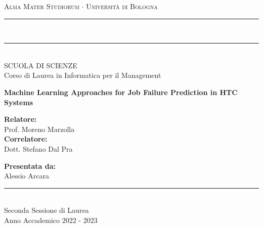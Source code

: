 \begin{titlepage}
  \centering
  {\Large \textsc{Alma Mater Studiorum $\cdot$ Università di Bologna}} \\
  \vspace{1mm}
  \rule[0.1cm]{15.8cm}{0.1mm} \\
  \rule[0.5cm]{15.8cm}{0.6mm} \\
  {\small SCUOLA DI SCIENZE \\
  Corso di Laurea in Informatica per il Management} \\
  
  \vspace{40mm}
  
  {\LARGE \textbf{Machine Learning Approaches for Job Failure Prediction in HTC Systems}} \\
  
  \vspace{40mm}
  
  \begin{minipage}[t]{0.47\textwidth}
    \raggedright
    \large \textbf{Relatore:} \\
    Prof. Moreno Marzolla \\
    \vspace{5mm}
    \textbf{Correlatore:} \\ 
    Dott. Stefano Dal Pra \\
  \end{minipage}
  \hfill
  \begin{minipage}[t]{0.47\textwidth}
    \raggedleft
    \large \textbf{Presentata da:} \\
    Alessio Arcara
  \end{minipage}
  
  \vspace{20mm}
  
  \rule[0.1cm]{15.8cm}{0.1mm} \\
  {\large Seconda Sessione di Laurea \\
  Anno Accademico 2022 - 2023}

\end{titlepage}
